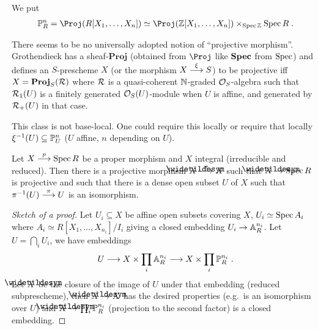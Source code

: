 \documentclass[a4paper,parskip=half,numbers=enddot, DIV=12]{scrreprt}
\begin{document}
\begin{example}
	We put
    \begin{align*}
        \IP^n_R = \Proj(R[X_1,\ldots, X_n])\simeq \Proj(\IZ[X_1,\ldots,X_n])\times_{\Spec \IZ}\Spec R\;.
    \end{align*}
\end{example}
\begin{rem}
    There seems to be no universally adopted notion of ``projective morphism''. Grothendieck has a sheaf-$\mathbf{Proj}$ (obtained from $\Proj$ like $\operatorname{\mathbf{Spec}}$ from $\operatorname{Spec}$) and defines an $S$-prescheme $X$ (or the morphism $X\morphism[\xi] S$) to be projective iff $X= \mathbf{Proj}_S(\mathcal{R})$ where $\mathcal{R}$ is a quasi-coherent $\mathbb{N}$-graded $\mathcal{O}_S$-algebra such that $\mathcal{R}_1(U)$ is a finitely generated $\mathcal{O}_S(U)$-module when $U$ is affine, and generated by $\mathcal{R}_+(U)$ in that case.
    
    This class is not base-local. One could require this locally or require that locally $\xi^{-1}(U) \subseteq \mathbb{P}^n_U$ ($U$ affine, $n$ depending on $U$).
\end{rem}
\begin{prop}
    Let $X\morphism[p] \Spec R$ be a proper morphism and $X$ integral (irreducible and reduced). Then there is a projective morphism $\snake X\morphism[\pi] X$ such that $\snake X\morphism \Spec R$ is projective and such that there is a dense open subset $U$ of $X$ such that $\pi^{-1}(U) \morphism[\pi] U$ is an isomorphism.
\end{prop}
\begin{proof}[Sketch of a proof]
    Let $U_i\subseteq X$ be affine open subsets covering $X$, $U_i\simeq \operatorname{Spec} A_i$ where $A_i\simeq R[X_1,\ldots, X_{n_i}]/I_i$ giving a closed embedding $U_i\morphism \IA^{n_i}_R$. Let $U = \bigcap_i U_i$, we have embeddings 
    \begin{align*}
        U\morphism X\times \prod_i \IA^{n_i}_R\morphism X\times\prod_i \IP^{n_i}_R\;.
    \end{align*}
    Let $\snake X$ be the closure of the image of $U$ under that embedding (reduced subprescheme), then $\snake X\morphism X$ has the desired properties (e.g.\ is an isomorphism over $U$) and $\snake X\morphism \prod_i \IP^{n_i}_R$ (projection to the second factor) is a closed embedding.
\end{proof}
\end{document}
